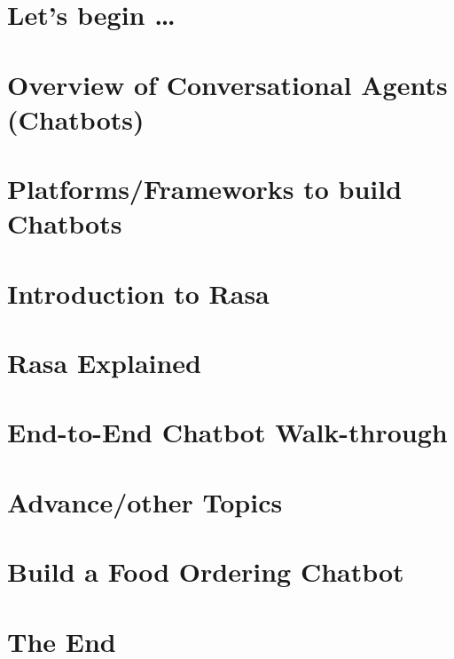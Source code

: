 \section[Start]{Let's begin \ldots}


\section[Overview]{Overview of Conversational Agents (Chatbots)}


\section[Platforms]{Platforms/Frameworks to build Chatbots}



\section[Intro]{Introduction to Rasa}



\section[Rasa]{Rasa Explained}







\section[Walk-through]{End-to-End Chatbot Walk-through}


\section[Other]{Advance/other Topics}










\section[Exercise]{Build a Food Ordering Chatbot}


\section[End]{The End}


